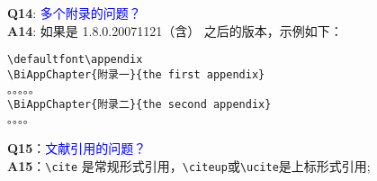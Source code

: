 \noindent \textbf{Q14}: \textcolor{blue}{多个附录的问题？}\\
\textbf{A14}: 如果是 1.8.0.20071121（含） 之后的版本，示例如下：
\begin{verbatim}
\defaultfont\appendix
\BiAppChapter{附录一}{the first appendix}
。。。。。
\BiAppChapter{附录二}{the second appendix}
。。。。
\end{verbatim}

\noindent \textbf{Q15}：\textcolor{blue}{文献引用的问题？ }\\
\textbf{A15}：\verb+\cite+ 是常规形式引用，\verb+\citeup+或\verb+\ucite+是上标形式引用;


